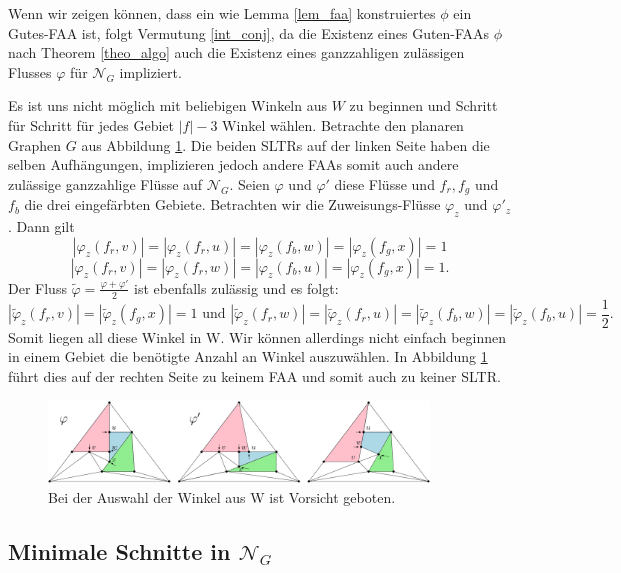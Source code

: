 Wenn wir zeigen können, dass ein wie Lemma \ref{lem_faa} konstruiertes $\phi$ ein Gutes-FAA ist, folgt Vermutung \ref{int_conj}, da die Existenz eines Guten-FAAs $\phi$ nach Theorem \ref{theo_algo} auch die Existenz eines ganzzahligen zulässigen Flusses $\varphi$ für $\mathcal{N}_G$ impliziert.

\begin{example}
Es ist uns nicht möglich mit beliebigen Winkeln aus $W$ zu beginnen und Schritt für Schritt für jedes Gebiet $|f|-3$ Winkel wählen. Betrachte den planaren Graphen $G$ aus Abbildung \ref{lem_faa_choice_ex}. Die beiden SLTRs auf der linken Seite haben die selben Aufhängungen, implizieren jedoch andere FAAs somit auch andere zulässige ganzzahlige Flüsse auf $\mathcal{N}_G$. Seien $\varphi$ und $\varphi'$ diese Flüsse und $f_{r},f_{g}$ und $f_b$ die drei eingefärbten Gebiete. Betrachten wir die Zuweisungs-Flüsse $\varphi_z$ und $\varphi'_z$. Dann gilt $$|\varphi_z(f_r,v)|=|\varphi_z(f_r,u)|=|\varphi_z(f_b,w)| = |\varphi_z(f_g,x)| = 1$$
$$|\varphi_z(f_r,v)|=|\varphi_z(f_r,w)|=|\varphi_z(f_b,u)| = |\varphi_z(f_g,x)| = 1.$$
Der Fluss $\tilde{\varphi}=\frac{\varphi+\varphi'}{2}$ ist ebenfalls zulässig und es folgt:
$$|\tilde{\varphi}_z(f_r,v)|=|\tilde{\varphi}_z(f_g,x)| = 1 \text{ und } |\tilde{\varphi}_z(f_r,w)|=|\tilde{\varphi}_z(f_r,u)| = |\tilde{\varphi}_z(f_b,w)|=|\tilde{\varphi}_z(f_b,u)| = \frac{1}{2}.$$
Somit liegen all diese Winkel in W. Wir können allerdings nicht einfach beginnen in einem Gebiet die benötigte Anzahl an Winkel auszuwählen. In Abbildung \ref{lem_faa_choice_ex} führt dies auf der rechten Seite zu keinem FAA und somit auch zu keiner SLTR.

\begin{figure}[h]
	\centering
  	\includegraphics[width=0.9\textwidth]{lem_faa_choice_ex.png}
  	\caption{Bei der Auswahl der Winkel aus W ist Vorsicht geboten.}
	\label{lem_faa_choice_ex}
\end{figure}
\end{example}

\subsection{Minimale Schnitte in $\mathcal{N}_G$}

